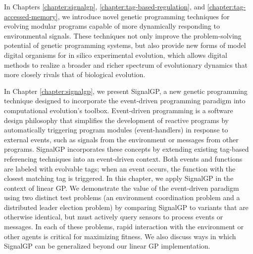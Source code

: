 
In Chapters \ref{chapter:signalgp}, \ref{chapter:tag-based-regulation}, and \ref{chapter:tag-accessed-memory}, we introduce novel genetic programming techniques for evolving modular programs capable of more dynamically responding to environmental signals. 
These techniques not only improve the problem-solving potential of genetic programming systems, but also provide new forms of model digital organisms for in silico experimental evolution, which allows digital methods to realize a broader and richer spectrum of evolutionary dynamics that more closely rivals that of biological evolution.

In Chapter \ref{chapter:signalgp}, we present SignalGP, a new genetic programming technique designed to incorporate the event-driven programming paradigm into computational evolution's toolbox. 
Event-driven programming is a software design philosophy that simplifies the development of reactive programs by automatically triggering program modules (event-handlers) in response to external events, such as signals from the environment or messages from other programs. 
SignalGP incorporates these concepts by extending existing tag-based referencing techniques into an event-driven context. 
Both events and functions are labeled with evolvable tags; when an event occurs, the function with the closest matching tag is triggered. 
In this chapter, we apply SignalGP in the context of linear GP. 
We demonstrate the value of the event-driven paradigm using two distinct test problems (an environment coordination problem and a distributed leader election problem) by comparing SignalGP to variants that are otherwise identical, but must actively query sensors to process events or messages. 
In each of these problems, rapid interaction with the environment or other agents is critical for maximizing fitness. 
We also discuss ways in which SignalGP can be generalized beyond our linear GP implementation.

